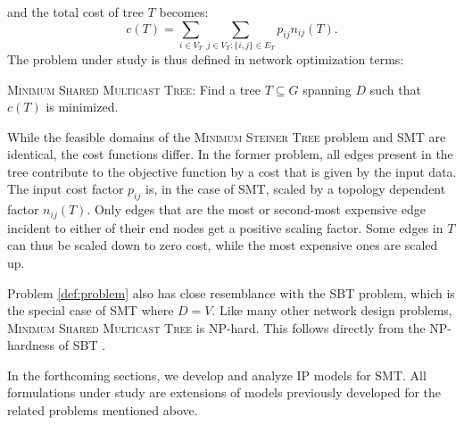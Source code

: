 \noindent
and the total cost of tree $T$ becomes:
$$
  c(T) = \sum_{i\in V_T}\sum_{j\in V_T:\{i,j\}\in E_T}p_{ij}n_{ij}(T).
$$ 
The problem under study is thus defined in network optimization terms:

\begin{problem}
\label{def:problem}
\textsc{Minimum Shared Multicast Tree}: Find a tree $T\subseteq G$ spanning $D$ such that $c(T)$ is minimized.
\end{problem}

While the feasible domains of the \textsc{Minimum Steiner Tree} problem and SMT are identical,
the cost functions differ.
In the former problem, all edges present in the tree contribute to the objective function by a cost that is given by the input data.
The input cost factor $p_{ij}$ is, in the case of SMT, scaled by a topology dependent factor $n_{ij}(T)$.
Only edges that are the most or second-most expensive edge incident to either of their end nodes get a positive scaling factor.
Some edges in $T$ can thus be scaled down to zero cost, while the most expensive ones are scaled up.

Problem \ref{def:problem} also has close resemblance with the SBT problem, which is the special case of SMT where $D=V$.
Like many other network design problems, \textsc{Minimum Shared Multicast Tree} is NP-hard.
This follows directly from the NP-hardness of SBT \citep{Papadimitriou06SBT}.


In the forthcoming sections, we develop and analyze IP models for SMT.
All formulations under study are extensions of models previously developed for the related problems mentioned above.
